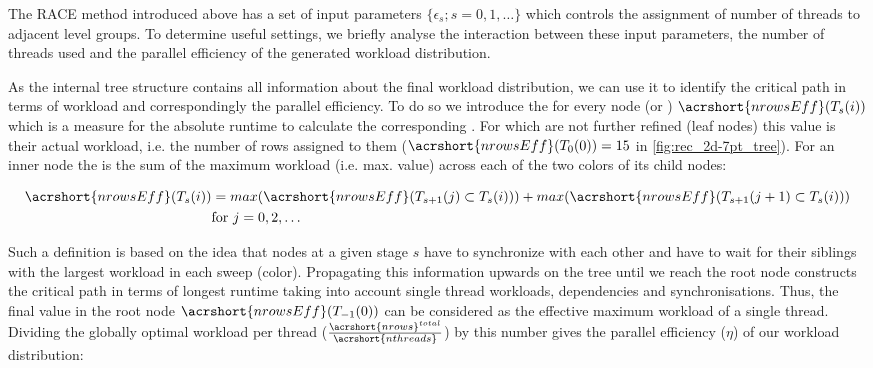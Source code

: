 


The \acrshort{RACE} method introduced above has a set of input parameters $\{\epsilon_s; s=0,1,\ldots\}$ which controls the assignment of number of threads to adjacent level groups. 
To determine useful settings, we briefly analyse the interaction between these input parameters, the number of threads used and the parallel efficiency of the generated workload distribution. 

As the internal tree structure contains all information about the final workload distribution, we can use it to identify the critical path in terms of workload and correspondingly the parallel efficiency. To do so we introduce the \effRow for every node (or \levelGroup) $\acrshort{nrowsEff}(T_s(i))$  which is a measure for the absolute runtime to calculate the corresponding \levelGroup. For \levelGroups which are not further refined (leaf nodes) this value is their actual workload, i.e. the number of rows assigned to them ($\acrshort{nrowsEff}(T_0(0)) = 15$ in \cref{fig:rec_2d-7pt_tree}). For an inner node the \effRow  is the sum of the maximum workload (i.e. max. \effRow value) across each of the two colors of its child nodes:

\begin{align*}
\acrshort{nrowsEff}(T_s(i)) &= max(\acrshort{nrowsEff}(T_{s+1}(j) \subset T_s(i))) + max(\acrshort{nrowsEff}(T_{s+1}(j+1) \subset T_s(i)))\\
 & \text{for } j=0,2,\ldots
\end{align*}

Such a definition is based on the idea that nodes at a given stage $s$ have to synchronize with each other and have to wait for their siblings with the largest workload in each sweep (color). Propagating this information upwards on the tree until we reach the root node constructs the critical path in terms of longest runtime taking into account single thread workloads, dependencies and synchronisations. Thus, the final value in the root node $\acrshort{nrowsEff}(T_{-1}(0))$ can be considered as the effective maximum workload of a single thread. Dividing the globally optimal workload per thread ($\frac{\acrshort{nrows}^{total}}{\acrshort{nthreads}}$) by this number gives the parallel efficiency ($\eta$) of our workload distribution: 

